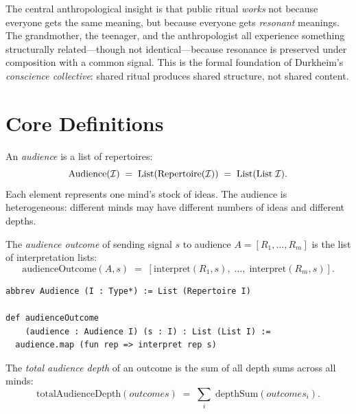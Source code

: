 The central anthropological insight is that public ritual \emph{works} not
because everyone gets the same meaning, but because everyone gets
\emph{resonant} meanings.  The grandmother, the teenager, and the
anthropologist all experience something structurally related---though not
identical---because resonance is preserved under composition with a common
signal.  This is the formal foundation of Durkheim's \emph{conscience
collective}: shared ritual produces shared structure, not shared content.


\section{Core Definitions}
\label{sec:mr-defs}

\begin{definition}[Audience]
\label{def:audience}
An \emph{audience} is a list of repertoires:
\[
  \mathrm{Audience}(\mathcal{I}) \;=\; \mathrm{List}(\mathrm{Repertoire}(\mathcal{I}))
  \;=\; \mathrm{List}(\mathrm{List}\;\mathcal{I}).
\]
Each element represents one mind's stock of ideas.  The audience is
heterogeneous: different minds may have different numbers of ideas and
different depths.
\end{definition}

\begin{definition}
\label{def:audience-outcome}
The \emph{audience outcome} of sending signal $s$ to audience
$A = [R_1,\ldots,R_m]$ is the list of interpretation lists:
\[
  \mathrm{audienceOutcome}(A, s) \;=\;
  [\mathrm{interpret}(R_1,s),\;\ldots,\;\mathrm{interpret}(R_m,s)].
\]
\end{definition}

\begin{lstlisting}[caption={Audience and audience outcome in Lean~4.}]
abbrev Audience (I : Type*) := List (Repertoire I)

def audienceOutcome
    (audience : Audience I) (s : I) : List (List I) :=
  audience.map (fun rep => interpret rep s)
\end{lstlisting}

\begin{definition}
\label{def:total-audience-depth}
The \emph{total audience depth} of an outcome is the sum of all depth sums
across all minds:
\[
  \mathrm{totalAudienceDepth}(\mathit{outcomes}) \;=\;
  \sum_{i}\;\mathrm{depthSum}(\mathit{outcomes}_i).
\]
\end{definition}


